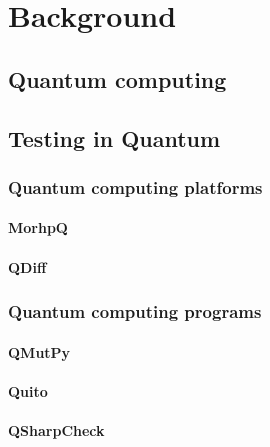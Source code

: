 \cleardoublepage

\chapter{Background}
\label{Ch2:Back}

\section{Quantum computing}
\label{Ch2.1:Quantum}

\section{Testing in Quantum}
\label{Ch2.2:TQuantum}

\subsection{Quantum computing platforms}
\label{Ch2.2.1:TPlat}

\subsubsection{MorhpQ}
\label{Ch2.2.1:MorphQ}

\subsubsection{QDiff}
\label{Ch2.2.1:QDiff}

\subsection{Quantum computing programs}
\label{Ch2.2:TQP}

\subsubsection{QMutPy}
\label{Ch2.2.2:QMutPy}

\subsubsection{Quito}
\label{Ch2.2.2:Quito}

\subsubsection{QSharpCheck}
\label{Ch2.2.2:QSharpCheck}
